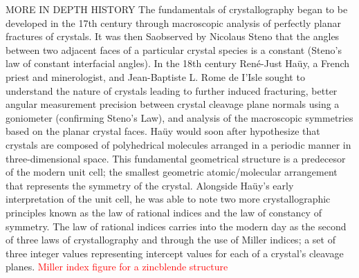  MORE IN DEPTH HISTORY
 The fundamentals of crystallography began to be developed in the 17th century through macroscopic analysis of perfectly planar fractures of crystals. It was then Saobserved by Nicolaus Steno that the angles between two adjacent faces of a particular crystal species is a constant (Steno's law of constant interfacial angles). In the 18th century René-Just Haüy, a French priest and minerologist, and Jean-Baptiste L. Rome de I'Isle sought to understand the nature of crystals leading to further induced fracturing, better angular measurement precision between crystal cleavage plane normals using a goniometer (confirming Steno's Law), and analysis of the macroscopic symmetries based on the planar crystal faces. Haüy would soon after hypothesize that crystals are composed of polyhedrical molecules arranged in a periodic manner in three-dimensional space. This fundamental geometrical structure is a predecesor of the modern unit cell; the smallest geometric atomic/molecular arrangement that represents the symmetry of the crystal. Alongside Haüy's early interpretation of the unit cell, he was able to note two more crystallographic principles known as the law of rational indices and the law of constancy of symmetry. The law of rational indices carries into the modern day as the second of three laws of crystallography and through the use of Miller indices; a set of three integer values representing intercept values for each of a crystal's cleavage planes.
\textcolor{red}{Miller index figure for a zincblende structure}
